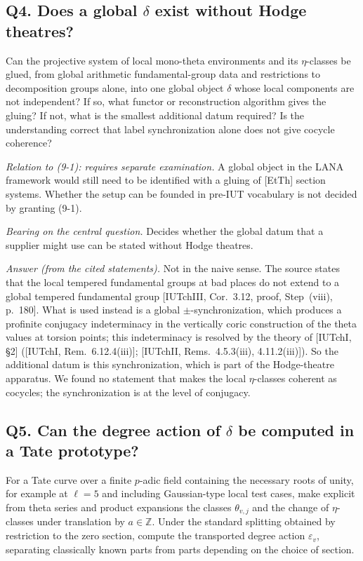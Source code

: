 \documentclass[11pt]{article}
\theoremstyle{definition}
\begin{document}
\subsection*{Q4. Does a global $\delta$ exist without Hodge theatres?}

Can the projective system of local mono-theta environments and
its $\eta$-classes be glued, from global arithmetic
fundamental-group data and restrictions to decomposition groups
alone, into one global object $\delta$ whose local components
are not independent?  If so, what functor or reconstruction
algorithm gives the gluing?  If not, what is the smallest
additional datum required?  Is the understanding correct that
label synchronization alone does not give cocycle coherence?

\emph{Relation to (9-1): requires separate examination.}  A
global object in the LANA framework would still need to be
identified with a gluing of [EtTh] section systems.  Whether the
setup can be founded in pre-IUT vocabulary is not decided by
granting (9-1).

\emph{Bearing on the central question.}  Decides whether the global
datum that a supplier might use can be stated without Hodge
theatres.

\emph{Answer (from the cited statements).}  Not in the naive sense.
The source states that the local tempered fundamental groups at bad
places do not extend to a global tempered fundamental group
[IUTchIII, Cor.~3.12, proof, Step~(viii), p.~180].  What is used
instead is a global $\pm$-synchronization, which produces a profinite
conjugacy indeterminacy in the vertically coric construction of the
theta values at torsion points; this indeterminacy is resolved by the
theory of [IUTchI, \S2] ([IUTchI, Rem.~6.12.4(iii)];
[IUTchII, Rems.~4.5.3(iii), 4.11.2(iii)]).  So the additional datum
is this synchronization, which is part of the Hodge-theatre
apparatus.  We found no statement that makes the local
$\eta$-classes coherent as cocycles; the synchronization is at the
level of conjugacy.

\subsection*{Q5. Can the degree action of $\delta$ be computed in a Tate prototype?}

For a Tate curve over a finite $p$-adic field containing the
necessary roots of unity, for example at $\ell=5$ and including
Gaussian-type local test cases, make explicit from theta series
and product expansions the classes $\theta_{v,j}$ and the change
of $\eta$-classes under translation by $a\in\mathbb Z$.  Under
the standard splitting obtained by restriction to the zero
section, compute the transported degree action
$\varepsilon_v$, separating classically known parts from parts
depending on the choice of section.
\end{document}
